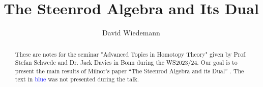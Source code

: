 \documentclass[11pt, a4paper]{article}
\theoremstyle{plain}
\begin{document}
\title{The Steenrod Algebra and Its Dual }
\author{David Wiedemann}
\maketitle
\begin{abstract}
	These are notes for the seminar "Advanced Topics in Homotopy Theory" given by Prof. Stefan Schwede and Dr. Jack Davies in Bonn during the WS2023/24. Our goal is to present the main results of Milnor's paper ``The Steenrod Algebra and its Dual'' \cite{steenrod_algebra_and_its_dual_milnor}. The text in \textcolor{blue}{blue} was not presented during the talk.
\end{abstract}
\tableofcontents


\end{document}
